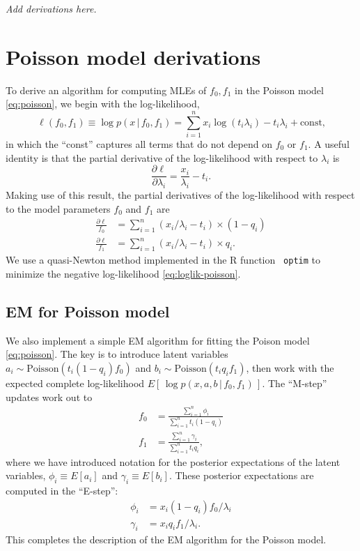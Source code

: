 \documentclass[final]{siamart171218}
\begin{document}
{\em Add derivations here.}

\section{Poisson model derivations}

To derive an algorithm for computing MLEs of $f_0, f_1$ in the Poisson
model \eqref{eq:poisson}, we begin with the log-likelihood,
\begin{equation}
\ell(f_0, f_1) \equiv \log p(x \,|\, f_0, f_1) = 
\sum_{i=1}^n x_i \log (t_i \lambda_i) - t_i \lambda_i +
\mbox{const,}
\label{eq:loglik-poisson}
\end{equation}
in which the ``const'' captures all terms that do not depend on $f_0$
or $f_1$. A useful identity is that the partial derivative of the
log-likelihood with respect to $\lambda_i$ is
\begin{equation*}
\frac{\partial\ell}{\partial\lambda_i} = \frac{x_i}{\lambda_i} - t_i.
\end{equation*}
Making use of this result, the partial derivatives of the
log-likelihood with respect to the model parameters $f_0$ and $f_1$
are
\begin{align}
\frac{\partial\ell}{f_0} &= 
\sum_{i=1}^n (x_i/\lambda_i - t_i) \times (1-q_i) \\
\frac{\partial\ell}{f_1} &= 
\sum_{i=1}^n (x_i/\lambda_i - t_i) \times q_i.
\end{align}
We use a quasi-Newton method implemented in the R function {\tt
  optim} to minimize the negative log-likelihood
\eqref{eq:loglik-poisson}.

\subsection{EM for Poisson model} 

We also implement a simple EM algorithm for fitting the Poison model
\eqref{eq:poisson}. The key is to introduce latent variables $a_i \sim
\mathrm{Poisson}(t_i (1-q_i) f_0)$ and $b_i \sim \mathrm{Poisson}(t_i
q_i f_1)$, then work with the expected complete log-likelihood
$E[\,\log p(x, a, b \,|\, f_0, f_1)\,]$. The ``M-step'' updates work
out to
\begin{align}
f_0 &= \frac{\sum_{i=1}^n \phi_i}{\sum_{i=1}^n t_i(1-q_i)} \\
f_1 &= \frac{\sum_{i=1}^n \gamma_i}{\sum_{i=1}^n t_i q_i},
\end{align}
where we have introduced notation for the posterior expectations of
the latent variables, $\phi_i \equiv E[a_i]$ and $\gamma_i \equiv
E[b_i]$. These posterior expectations are computed in the ``E-step'':
\begin{align}
\phi_i   &= x_i (1 - q_i) f_0 / \lambda_i \\
\gamma_i &= x_i q_i f_1 / \lambda_i.
\end{align}
This completes the description of the EM algorithm for the Poisson
model.
\end{document}
